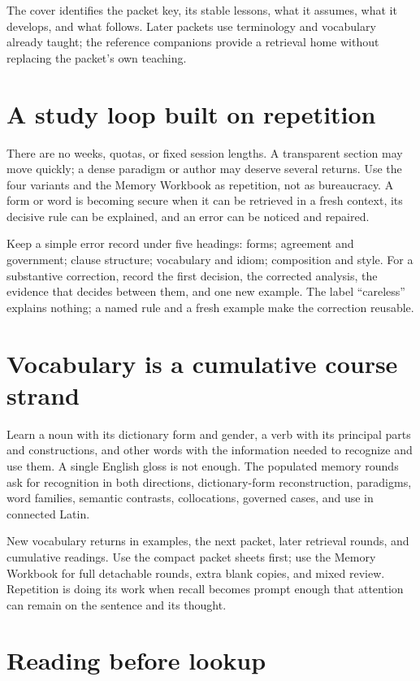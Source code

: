 The cover identifies the packet key, its stable lessons, what it assumes, what
it develops, and what follows. Later packets use terminology and vocabulary
already taught; the reference companions provide a retrieval home without
replacing the packet's own teaching.

\section{A study loop built on repetition}

\StudyLoop

There are no weeks, quotas, or fixed session lengths. A transparent section may
move quickly; a dense paradigm or author may deserve several returns. Use the
four variants and the Memory Workbook as repetition, not as bureaucracy. A
form or word is becoming secure when it can be retrieved in a fresh context,
its decisive rule can be explained, and an error can be noticed and repaired.

Keep a simple error record under five headings: forms; agreement and
government; clause structure; vocabulary and idiom; composition and style.
For a substantive correction, record the first decision, the corrected
analysis, the evidence that decides between them, and one new example. The
label “careless” explains nothing; a named rule and a fresh example make the
correction reusable.

\section{Vocabulary is a cumulative course strand}

Learn a noun with its dictionary form and gender, a verb with its principal
parts and constructions, and other words with the information needed to
recognize and use them. A single English gloss is not enough. The populated
memory rounds ask for recognition in both directions, dictionary-form
reconstruction, paradigms, word families, semantic contrasts, collocations,
governed cases, and use in connected Latin.

New vocabulary returns in examples, the next packet, later retrieval rounds,
and cumulative readings. Use the compact packet sheets first; use the Memory
Workbook for full detachable rounds, extra blank copies, and mixed review.
Repetition is doing its work when recall becomes prompt enough that attention
can remain on the sentence and its thought.

\section{Reading before lookup}

